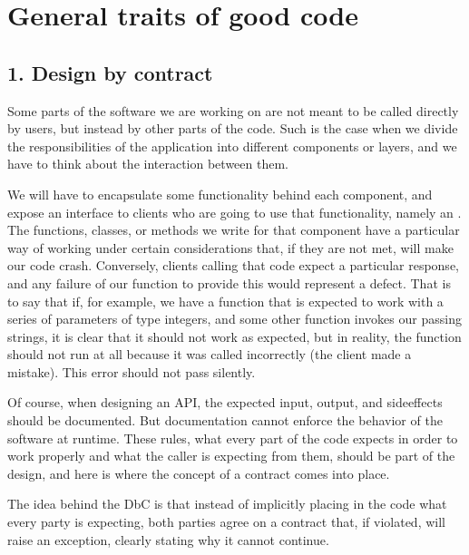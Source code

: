 \documentclass[a4paper,10pt,english]{sphinxmanual}
\begin{document}
\chapter{General traits of good code}
\label{\detokenize{chapters/3_general_traits/index:general-traits-of-good-code}}\label{\detokenize{chapters/3_general_traits/index::doc}}

\section{1. Design by contract}
\label{\detokenize{chapters/3_general_traits/index:design-by-contract}}
Some parts of the software we are working on are not meant to be called directly by users, but instead by
other parts of the code. Such is the case when we divide the responsibilities of the application into
different components or layers, and we have to think about the interaction between them.

We will have to encapsulate some functionality behind each component, and expose an interface to clients who
are going to use that functionality, namely an . The functions,
classes, or methods we write for that component have a particular way of working under certain considerations
that, if they are not met, will make our code crash. Conversely, clients calling that code expect a particular
response, and any failure of our function to provide this would represent a defect. That is to say that if,
for example, we have a function that is expected to work with a series of parameters of type integers, and
some other function invokes our passing strings, it is clear that it should not work as expected, but in
reality, the function should not run at all because it was called incorrectly (the client made a mistake).
This error should not pass silently.

Of course, when designing an API, the expected input, output, and side\sphinxhyphen{}effects should be documented. But
documentation cannot enforce the behavior of the software at runtime. These rules, what every part of the code
expects in order to work properly and what the caller is expecting from them, should be part of the design,
and here is where the concept of a contract comes into place.

The idea behind the DbC is that instead of implicitly placing in the code what every party is expecting, both
parties agree on a contract that, if violated, will raise an exception, clearly stating why it cannot
continue.
\end{document}
